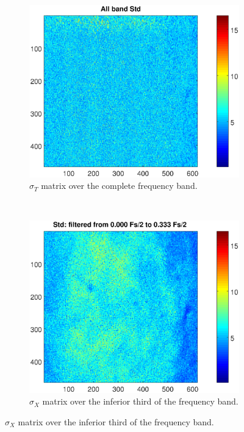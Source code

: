 \documentclass[review]{elsarticle}
\begin{document}
\begin{figure}[h!]
    \centering
    \begin{subfigure}[b]{0.485\textwidth}
        \includegraphics[width=\textwidth]{stdall.eps}
	\caption{$\sigma_T$ matrix over the complete frequency band.}
        \label{fig:papelall}
    \end{subfigure}
    ~
    \begin{subfigure}[b]{0.465\textwidth}
        \includegraphics[width=\textwidth]{stdx.eps}
	\caption{$\sigma_X$ matrix over the inferior third of the frequency band.}

\end{subfigure}
\end{figure}
\end{document}
